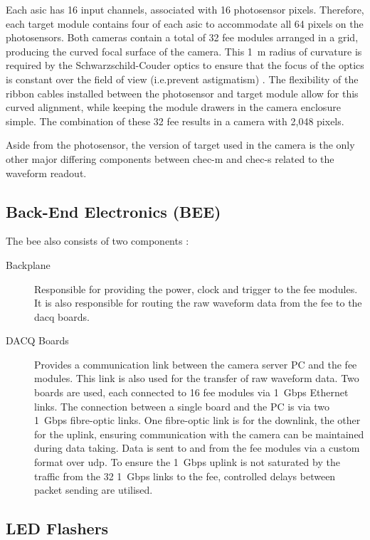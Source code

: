 Each \gls{asic} has 16 input channels, associated with 16 photosensor pixels. Therefore, each \gls{target} module contains four of each \gls{asic} to accommodate all 64 pixels on the photosensors. Both cameras contain a total of 32 \gls{fee} modules arranged in a grid, producing the curved focal surface of the camera. This \SI{1}{m} radius of curvature is required by the Schwarzschild-Couder optics to ensure that the focus of the optics is constant over the field of view (i.e.\@ prevent astigmatism) \cite{Vassiliev2007}. The flexibility of the ribbon cables installed between the photosensor and \gls{target} module allow for this curved alignment, while keeping the module drawers in the camera enclosure simple. The combination of these 32 \gls{fee} results in a camera with 2,048 pixels.

Aside from the photosensor, the version of \gls{target} used in the camera is the only other major differing components between \gls{chec-m} and \gls{chec-s} related to the waveform readout. 

\subsection{Back-End Electronics (BEE)} \label{section:bee}

The \gls{bee} also consists of two components \cite{Zorn2017}:
\begin{description}
\item [Backplane] Responsible for providing the power, clock and trigger to the \gls{fee} modules. It is also responsible for routing the raw waveform data from the \gls{fee} to the \gls{dacq} boards. 
\item [DACQ Boards] Provides a communication link between the camera server PC and the \gls{fee} modules. This link is also used for the transfer of raw waveform data. Two boards are used, each connected to 16 \gls{fee} modules via \SI{1}{Gbps} Ethernet links. The connection between a single board and the PC is via two \SI{1}{Gbps} fibre-optic links. One fibre-optic link is for the downlink, the other for the uplink, ensuring communication with the camera can be maintained during data taking. Data is sent to and from the \gls{fee} modules via a custom format over \gls{udp}. To ensure the \SI{1}{Gbps} uplink is not saturated by the traffic from the 32 \SI{1}{Gbps} links to the \gls{fee}, controlled delays between packet sending are utilised.
\end{description}

\subsection{LED Flashers} \label{section:led_flashers}

